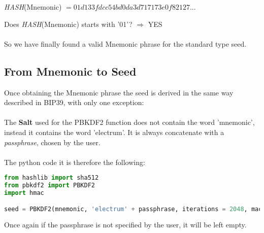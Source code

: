 \begin{center}
	\textit{HASH}(Mnemonic) $= 01d133fdcc54bd0da3d717173e0f82127...$
\end{center}
Does \textit{HASH}(Mnemonic) starts with '01'? $\Rightarrow$ YES
\\ \\
So we have finally found a valid Mnemonic phrase for the standard type seed.


\subsection{From Mnemonic to Seed}
Once obtaining the Mnemonic phrase the seed is derived in the same way described in BIP39, with only one exception:
\\ \\
The \textbf{Salt} used for the PBKDF2 function does not contain the word 'mnemonic', instead it contains the word 'electrum'. It is always concatenate with a \textit{passphrase}, chosen by the user.
\\ \\
The python code it is therefore the following:  

\begin{lstlisting}[language=Python]
from hashlib import sha512
from pbkdf2 import PBKDF2
import hmac

seed = PBKDF2(mnemonic, 'electrum' + passphrase, iterations = 2048, macmodule = hmac, digestmodule = sha512).read(64)
\end{lstlisting}


\begin{flushleft}
	Once again if the passphrase is not specified by the user, it will be left empty.
\end{flushleft}



